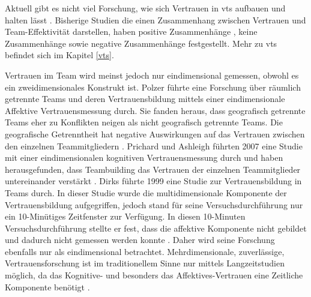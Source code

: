 \documentclass[a4paper,11pt]{article}%
\renewcommand{\\}{\vspace*{0.5\baselineskip} \newline}
\begin{document}
Aktuell gibt es nicht viel Forschung, wie sich Vertrauen in \ac{vts} aufbauen und halten lässt \citep[p.8-23]{duarte2006mastering}.
Bisherige Studien die einen Zusammenhang zwischen Vertrauen und Team-Effektivität darstellen, haben positive Zusammenhänge \citep{davis2000trusted}, keine Zusammenhänge \citep{hertel2004managing} sowie negative Zusammenhänge \citep{dirks1999effects} festgestellt.
Mehr zu \ac{vts} befindet sich im Kapitel \ref{vts}.

Vertrauen im Team wird meinst jedoch nur eindimensional gemessen, obwohl es ein zweidimensionales Konstrukt ist.
Polzer führte eine Forschung über räumlich getrennte Teams und deren Vertrauensbildung mittels einer eindimensionale Affektive Vertrauensmessung durch. Sie fanden heraus, dass geografisch getrennte Teams eher zu Konflikten neigen als nicht geografisch getrennte Teams. Die geografische Getrenntheit hat negative Auswirkungen auf das Vertrauen zwischen den einzelnen Teammitgliedern \citep[p.682]{polzer2006extending}.
Prichard und Ashleigh führten 2007 eine Studie mit einer eindimensionalen kognitiven Vertrauensmessung durch und haben herausgefunden, dass Teambuilding das Vertrauen der einzelnen Teammitglieder untereinander verstärkt \citep[p.704]{prichard2007effects}.
Dirks führte 1999 eine Studie zur Vertrauensbildung in Teams durch. In dieser Studie wurde die multidimensionale Komponente der Vertrauensbildung aufgegriffen, jedoch stand für seine Versuchsdurchführung nur ein 10-Minütiges Zeitfenster zur Verfügung. In diesen 10-Minuten Versuchsdurchführung stellte er fest, dass die affektive Komponente nicht gebildet und dadurch nicht gemessen werden konnte \citep[p.445]{mayer1995integrative}. Daher wird seine Forschung ebenfalls nur als eindimensional betrachtet.
Mehrdimensionale, zuverlässige, Vertrauensforschung ist im traditionellem Sinne nur mittels Langzeitstudien möglich, da das Kognitive- und besonders das Affektives-Vertrauen eine Zeitliche Komponente benötigt \citep{jones1998experience}.
\end{document}
